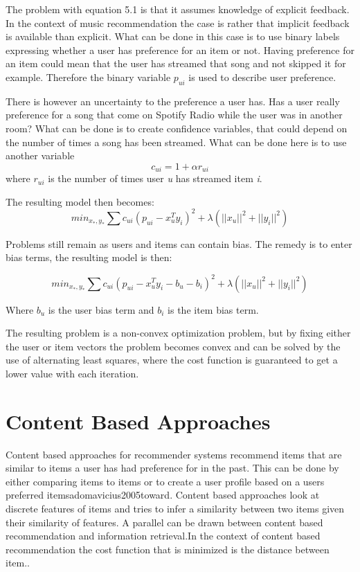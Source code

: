 \documentclass[a4paper,11pt]{kth-mag}
\begin{document}
The problem with equation 5.1 is that it assumes knowledge of explicit feedback. In the context of music recommendation the case is rather that implicit feedback is available than explicit. What can be done in this case is to use binary labels expressing whether a user has preference for an item or not. Having preference for an item could mean that the user has streamed that song and not skipped it for example. Therefore the binary variable $p_{ui}$ is used to describe user preference.

There is however an uncertainty to the preference a user has. Has a user really preference for a song that come on Spotify Radio while the user was in another room? What can be done is to create confidence variables, that could depend on the number of times a song has been streamed. What can be done here is to use another variable \[ c_{ui} = 1 + \alpha r_{ui} \] where $r_{ui}$ is the number of times user \textit{u} has streamed item \textit{i}.

The resulting model then becomes:
\begin{equation}
min_{x_*,y_*} \sum c_{ui}(p_{ui} - x_u^Ty_i)^2 +  \lambda(||x_u||^2 + ||y_i||^2)
\end{equation}

Problems still remain as users and items can contain bias. The remedy is to enter bias terms, the resulting model is then:

\begin{equation}
min_{x_*,y_*} \sum c_{ui}(p_{ui} - x_u^Ty_i - b_u - b_i)^2 +  \lambda(||x_u||^2 + ||y_i||^2)
\end{equation}

Where $b_u$ is the user bias term and $b_i$ is the item bias term.

The resulting problem is a non-convex optimization problem, but by fixing either the user or item vectors the problem becomes convex and can be solved by the use of alternating least squares, where the cost function is guaranteed to get a lower value with each iteration\cite{hu2008collaborative}.

\section{Content Based Approaches}
Content based approaches for recommender systems recommend items that are similar to items  a user has had preference for in the past. This can be done by either comparing items to items or to create a user profile based on a users preferred items{adomavicius2005toward}. Content based approaches look at discrete features of items and tries to infer a similarity between two items given their similarity of features. A parallel can be drawn between content based recommendation and information retrieval.In the context of content based recommendation the cost function that is minimized is the distance between item.\cite{adomavicius2005toward}.
\end{document}
